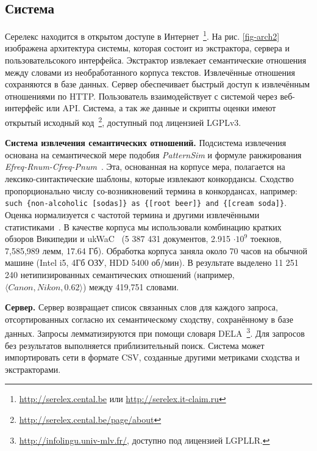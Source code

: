 \documentclass[a4paper,10pt,twoside]{article}
\begin{document}
\subsection{Система}

Серелекс находится в открытом доступе в Интернет~\footnote{\url{http://serelex.cental.be} или \url{http://serelex.it-claim.ru}}.
На рис. \ref{fig-arch2} изображена архитектура системы, которая состоит из экстрактора, сервера и пользовательсокого интерфейса. Экстрактор извлекает семантические отношения между словами из необработанного корпуса текстов. Извлечённые отношения сохраняются в базе данных. Сервер обеспечивает быстрый доступ к извлечённым отношениями по HTTP. Пользователь взаимодействует с системой через веб-интерфейс или API. Система, а так же данные и скрипты оценки имеют открытый исходный код~\footnote{ \url{http://serelex.cental.be/page/about}}, доступный под лицензией LGPLv3.


\textbf{Система извлечения семантических отношений.} Подсистема извлечения основана на семантической мере подобия \textit{PatternSim} и  формуле ранжирования \textit{Efreq-Rnum-Cfreq-Pnum}~\cite{panchenko2012konvens}. Эта, основанная на корпусе мера, полагается на лексико-синтактические шаблоны, которые извлекают конкордансы. Сходство пропорционально числу со-возникновений термина в конкордансах, например: \texttt{  such \{non-alcoholic [sodas]\} as \{[root beer]\} and \{[cream soda]\}}. Оценка нормализуется с частотой термина и другими извлечёнными статистиками~\cite{panchenko2012konvens}. В качестве корпуса мы использовали комбинацию кратких обзоров Википедии и ukWaC~\cite{baroni2009wacky} (5 387 431 документов, 2.915 $\cdot 10^9$ тоекнов, 7,585,989 лемм, 17.64 Гб). Обработка корпуса заняла около 70 часов на обычной машине (Intel i5, 4Гб ОЗУ, HDD 5400 об/мин). В результате выделено  11 251 240 нетипизированных семантических отношений (например, $\langle Canon, Nikon, 0.62 \rangle$) между 419,751 словами. 

\textbf{Сервер.} Сервер возвращает список связанных слов для каждого запроса, отсортированных согласно их семантическому сходству, сохранённому в базе данных. Запросы лемматизируются при помощи словаря DELA~\footnote{\url{http://infolingu.univ-mlv.fr/}, доступно под лицензией LGPLLR.}. Для запросов без результатов выполняется приблизительный поиск. Система может импортировать сети в формате CSV, созданные другими метриками сходства и экстракторами.
\end{document}
